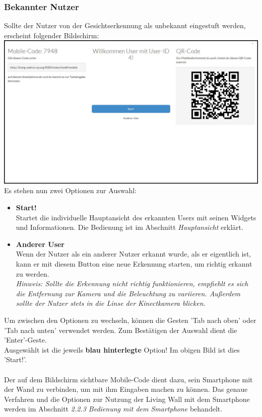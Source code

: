 \documentclass[10pt,a4paper]{report}
\begin{document}
		\subsubsection{Bekannter Nutzer}
		Sollte der Nutzer von der Gesichtserkennung als unbekannt eingestuft werden, erscheint folgender Bildschirm:\\
		\includegraphics[scale=0.31]{Welcome}\\
		Es stehen nun zwei Optionen zur Auswahl:
			\begin{itemize}
				\item \textbf{Start!}\\
					Startet die individuelle Hauptansicht des erkannten Users mit seinen Widgets und Informationen. Die Bedienung ist im Abschnitt \textit{Hauptansicht} erklärt.
				\item \textbf{Anderer User}\\
				Wenn der Nutzer als ein anderer Nutzer erkannt wurde, als er eigentlich ist, kann er mit diesem Button eine neue Erkennung starten, um richtig erkannt zu werden.\\
				\textit{Hinweis: Sollte die Erkennung nicht richtig funktionieren, empfiehlt es sich die Entfernung zur Kamera und die Beleuchtung zu variieren. Außerdem sollte der Nutzer stets in die Linse der Kinectkamera blicken.}
			\end{itemize}
		Um zwischen den Optionen zu wechseln, können die Gesten 'Tab nach oben' oder 'Tab nach unten' verwendet werden. Zum Bestätigen der Auswahl dient die 'Enter'-Geste.\\
Ausgewählt ist die jeweils \textbf{blau hinterlegte} Option! Im obigen Bild ist dies 'Start!'.\\ \\
Der auf dem Bildschirm sichtbare Mobile-Code dient dazu, sein Smartphone mit der Wand zu verbinden, um mit ihm Eingaben machen zu können. Das genaue Verfahren und die Optionen zur Nutzung der Living Wall mit dem Smartphone werden im Abschnitt 	\textit{2.2.3 Bedienung mit dem Smartphone} behandelt.
\end{document}

